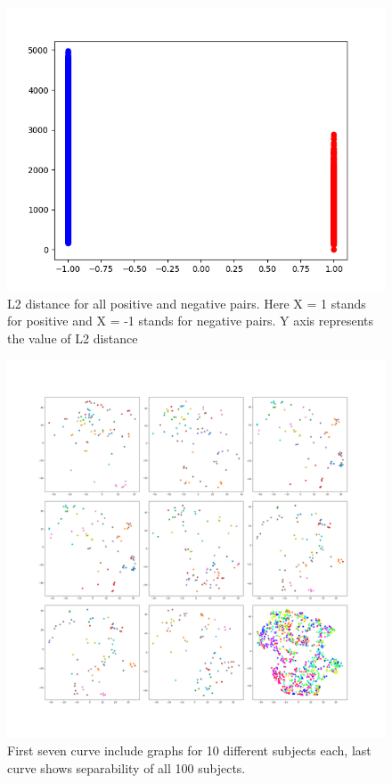 \begin{figure}[htbp]
\centering
\includegraphics[scale=1]{./Chapter4/Figures/TRPnorms_pos_neg_1}
\caption{L2 distance for all positive and negative pairs. Here X = 1 stands for positive and X = -1 stands for negative pairs. Y axis represents the value of L2 distance}
\label{fig:figure11}
\end{figure}

\begin{figure}[htbp]
\centering
\includegraphics[scale=0.3]{./Chapter4/Figures/TRPtsne_1}
\caption{First seven curve include graphs for 10 different subjects each, last curve shows separability of all 100 subjects.}
\label{fig:figure12}
\end{figure}


